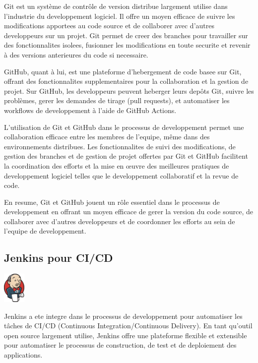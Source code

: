 \documentclass[a4paper, 11pt, openany]{report}
\begin{document}
Git est un système de contrôle de version distribue largement utilise dans l'industrie du developpement logiciel. Il offre un moyen efficace de suivre les modifications apportees au code source et de collaborer avec d'autres developpeurs sur un projet. Git permet de creer des branches pour travailler sur des fonctionnalites isolees, fusionner les modifications en toute securite et revenir à des versions anterieures du code si necessaire.

GitHub, quant à lui, est une plateforme d'hebergement de code basee sur Git, offrant des fonctionnalites supplementaires pour la collaboration et la gestion de projet. Sur GitHub, les developpeurs peuvent heberger leurs depôts Git, suivre les problèmes, gerer les demandes de tirage (pull requests), et automatiser les workflows de developpement à l'aide de GitHub Actions.

L'utilisation de Git et GitHub dans le processus de developpement permet une collaboration efficace entre les membres de l'equipe, même dans des environnements distribues. Les fonctionnalites de suivi des modifications, de gestion des branches et de gestion de projet offertes par Git et GitHub facilitent la coordination des efforts et la mise en œuvre des meilleures pratiques de developpement logiciel telles que le developpement collaboratif et la revue de code.

En resume, Git et GitHub jouent un rôle essentiel dans le processus de developpement en offrant un moyen efficace de gerer la version du code source, de collaborer avec d'autres developpeurs et de coordonner les efforts au sein de l'equipe de developpement.


\subsection{Jenkins pour CI/CD}
\begin{center}
\includegraphics[height=1.5cm]{assets/images/jenkins.png}
\end{center}

Jenkins a ete integre dans le processus de developpement pour automatiser les tâches de CI/CD (Continuous Integration/Continuous Delivery). En tant qu'outil open source largement utilise, Jenkins offre une plateforme flexible et extensible pour automatiser le processus de construction, de test et de deploiement des applications.
\end{document}
